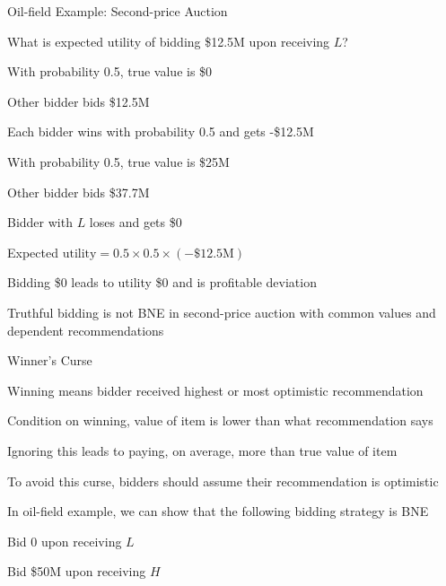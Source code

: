 \documentclass[11pt,aspectratio=169]{beamer}
\begin{document}
  
  \begin{frame}{Oil-field Example: Second-price Auction}
   \begin{itemize}[<+->]
   \setlength{\itemsep}{0.6em}
    \item What is expected utility of bidding \$12.5M upon receiving $L$?
    \begin{itemizes}[0.5em]
     \item With probability 0.5, true value is \$0
     \begin{itemizes}[0.4em]
      \item Other bidder bids \$12.5M
      \item Each bidder wins with probability 0.5 and gets -\$12.5M
     \end{itemizes}
     \item With probability 0.5, true value is \$25M
     \begin{itemizes}[0.4em]
      \item Other bidder bids \$37.7M
      \item Bidder with $L$ loses and gets \$0
     \end{itemizes}
     \item Expected $\text{utility} = 0.5 \times 0.5 \times (-\text{\$12.5M})$
    \end{itemizes}
    \item Bidding \$0 leads to utility \$0 and is \alert{profitable deviation}
    \item \alert{Truthful bidding is not BNE in second-price auction with common values and dependent recommendations}
   \end{itemize}
  \end{frame}
  
  
  \begin{frame}{Winner's Curse}
   \begin{itemizes}
    \item Winning means bidder received highest or \alert{most optimistic} recommendation
    \item Condition on winning, value of item is lower than what recommendation says
    \item Ignoring this leads to paying, on average, \alert{more than} true value of item
    \item To avoid this curse, bidders should assume their recommendation is optimistic
    \item In oil-field example, we can show that the following bidding strategy is BNE
    \begin{itemizes}
     \item Bid 0 upon receiving $L$
     \item Bid \$50M upon receiving $H$  
    \end{itemizes} 
   \end{itemizes}
  \end{frame}
  
\end{document}
